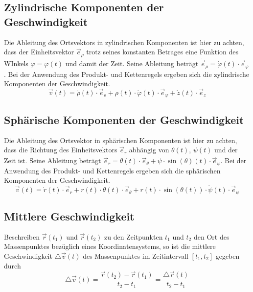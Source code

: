 \subsection{Zylindrische Komponenten der Geschwindigkeit}
Die Ableitung des Ortsvektors in zylindrischen Komponenten ist hier zu achten, dass der Einheitsvektor $\overrightarrow{e}_{\rho}$ trotz seines konstanten Betrages eine Funktion des WInkels $\varphi=\varphi\left(t\right)$ und damit der Zeit. Seine Ableitung beträgt $\dot{\overrightarrow{e}}_{\rho}=\dot{\varphi}\left(t\right)\cdot \overrightarrow{e}_{\varphi}$. Bei der Anwendung des Produkt- und Kettenregels ergeben sich die zylindrische Komponenten der Geschwindigkeit.
\begin{equation}  
\boxed{\overrightarrow{v}\left(t\right)=\dot{\rho}\left(t\right)\cdot\overrightarrow{e}_\rho+\rho\left(t\right)\cdot \dot{\varphi}\left(t\right)\cdot \overrightarrow{e}_{\varphi}+\dot{z}\left(t\right)\cdot \overrightarrow{e}_z}
\end{equation}
\subsection{Sphärische Komponenten der Geschwindigkeit}
Die Ableitung des Ortsvektor in sphärischen Komponenten ist hier zu achten, dass die Richtung des Einheitsvektors $\overrightarrow{e}_r$ abhängig von $\theta\left(t\right)$, $\psi\left(t\right)$ und der Zeit ist. Seine Ableitung beträgt $\dot{\overrightarrow{e}_r}=\dot{\theta}\left(t\right)\cdot \overrightarrow{e}_{\theta}+\dot{\psi}\cdot \sin\left(\theta\right)\left(t\right)\cdot \overrightarrow{e}_{\psi}$. Bei der Anwendung des Produkt- und Kettenregels ergeben sich die sphärischen Komponenten der Geschwindigkeit.
\begin{equation}
\boxed{\overrightarrow{v}\left(t\right)=\dot{r}\left(t\right)\cdot \overrightarrow{e}_r+r\left(t\right)\cdot \dot{\theta}\left(t\right)\cdot \overrightarrow{e}_{\theta}+r\left(t\right)\cdot \sin\left(\theta(t)\right)\cdot \dot{\psi}\left(t\right)\cdot \overrightarrow{e}_{\psi}}
\end{equation}
\subsection{Mittlere Geschwindigkeit}
Beschreiben $\overrightarrow{r}\left(t_1\right)$ und $\overrightarrow{r}\left(t_2\right)$ zu den Zeitpunkten $t_1$ und $t_2$ den Ort des Massenpunktes bezüglich eines Koordinatensystems, so ist die mittlere Geschwindigkeit $\triangle \overrightarrow{v}\left(t\right)$ des Massenpunktes im Zeitintervall $[t_1, t_2]$ gegeben durch
\begin{equation} 
\boxed{\triangle \overrightarrow{v}\left(t\right)=\dfrac{\overrightarrow{r}\left(t_2\right)-\overrightarrow{r}\left(t_1\right)}{t_2-t_1}=\dfrac{\triangle \overrightarrow{r}\left(t\right)}{t_2-t_1}}
\end{equation}
